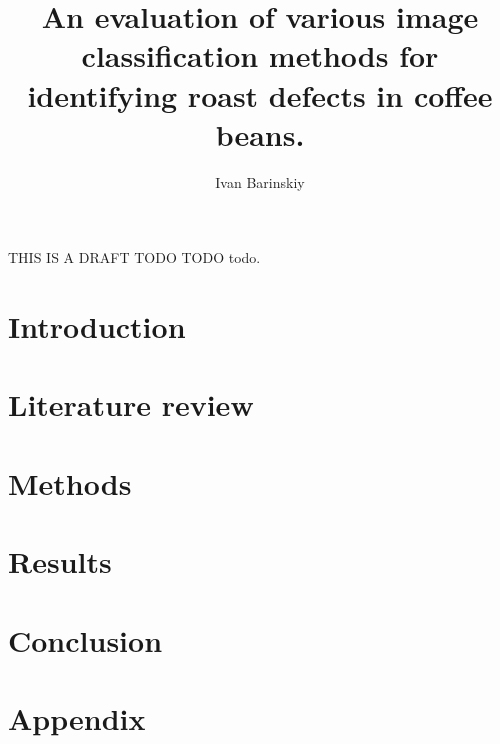 \documentclass{./template/UoYCSproject}
\author{Ivan Barinskiy}
\title{An evaluation of various image classification methods for identifying roast defects in coffee beans.}
\begin{document}
\maketitle
\listoffigures
\listoftables

\begin{summary}
THIS IS A DRAFT TODO TODO todo.
\end{summary}

\chapter{Introduction}\label{ch:introduction}


\chapter{Literature review}\label{ch:litreview}

\chapter{Methods}\label{ch:methods}

\chapter{Results}\label{ch:results}

\chapter{Conclusion}\label{ch:conclusion}

\appendix
\chapter{Appendix}\label{ch:appendix}

\printbibliography
\end{document}
